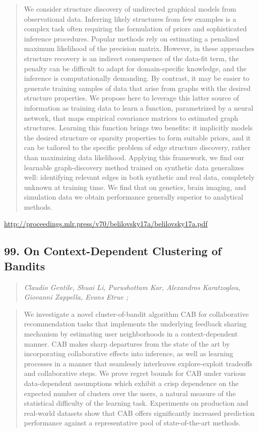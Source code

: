 \documentclass{article}
\begin{document}
\begin{quote}
    We consider structure discovery of undirected graphical models from observational data. Inferring likely structures from few examples is a complex task often requiring the formulation of priors and sophisticated inference procedures. Popular methods rely on estimating a penalized maximum likelihood of the precision matrix. However, in these approaches structure recovery is an indirect consequence of the data-fit term, the penalty can be difficult to adapt for domain-specific knowledge, and the inference is computationally demanding. By contrast, it may be easier to generate training samples of data that arise from graphs with the desired structure properties. We propose here to leverage this latter source of information as training data to learn a function, parametrized by a neural network, that maps empirical covariance matrices to estimated graph structures. Learning this function brings two benefits: it implicitly models the desired structure or sparsity properties to form suitable priors, and it can be tailored to the specific problem of edge structure discovery, rather than maximizing data likelihood. Applying this framework, we find our learnable graph-discovery method trained on synthetic data generalizes well: identifying relevant edges in both synthetic and real data, completely unknown at training time. We find that on genetics, brain imaging, and simulation data we obtain performance generally superior to analytical methods.  \end{quote}

\href{http://proceedings.mlr.press/v70/belilovsky17a/belilovsky17a.pdf}{http://proceedings.mlr.press/v70/belilovsky17a/belilovsky17a.pdf}

\subsection{99. On Context-Dependent Clustering of Bandits}

\begin{quote}
\footnotesize{\textit{Claudio Gentile, Shuai Li, Purushottam Kar, Alexandros Karatzoglou, Giovanni Zappella, Evans Etrue ;}}
\end{quote}

\begin{quote}
    We investigate a novel cluster-of-bandit algorithm CAB for collaborative recommendation tasks that implements the underlying feedback sharing mechanism by estimating user neighborhoods in a context-dependent manner. CAB makes sharp departures from the state of the art by incorporating collaborative effects into inference, as well as learning processes in a manner that seamlessly interleaves explore-exploit tradeoffs and collaborative steps. We prove regret bounds for CAB under various data-dependent assumptions which exhibit a crisp dependence on the expected number of clusters over the users, a natural measure of the statistical difficulty of the learning task. Experiments on production and real-world datasets show that CAB offers significantly increased prediction performance against a representative pool of state-of-the-art methods.  \end{quote}
\end{document}
